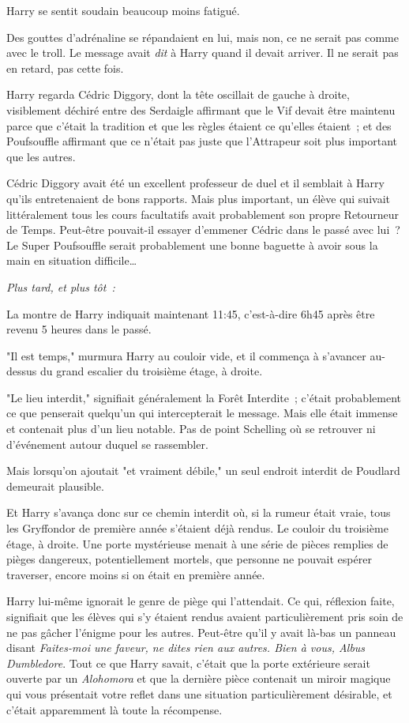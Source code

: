 Harry se sentit soudain beaucoup moins fatigué.

Des gouttes d'adrénaline se répandaient en lui, mais non, ce ne serait pas comme avec le troll. Le message avait \emph{dit} à Harry quand il devait arriver. Il ne serait pas en retard, pas cette fois.

Harry regarda Cédric Diggory, dont la tête oscillait de gauche à droite, visiblement déchiré entre des Serdaigle affirmant que le Vif devait être maintenu parce que c'était la tradition et que les règles étaient ce qu'elles étaient~; et des Poufsouffle affirmant que ce n'était pas juste que l'Attrapeur soit plus important que les autres.

Cédric Diggory avait été un excellent professeur de duel et il semblait à Harry qu'ils entretenaient de bons rapports. Mais plus important, un élève qui suivait littéralement tous les cours facultatifs avait probablement son propre Retourneur de Temps. Peut-être pouvait-il essayer d'emmener Cédric dans le passé avec lui~? Le Super Poufsouffle serait probablement une bonne baguette à avoir sous la main en situation difficile…

\later

\emph{Plus tard, et plus tôt~:}

La montre de Harry indiquait maintenant 11:45, c'est-à-dire 6h45 après être revenu 5 heures dans le passé.

"Il est temps," murmura Harry au couloir vide, et il commença à s'avancer au-dessus du grand escalier du troisième étage, à droite.

"Le lieu interdit," signifiait généralement la Forêt Interdite~; c'était probablement ce que penserait quelqu'un qui intercepterait le message. Mais elle était immense et contenait plus d'un lieu notable. Pas de point Schelling où se retrouver ni d'événement autour duquel se rassembler.

Mais lorsqu'on ajoutait "et vraiment débile," un seul endroit interdit de Poudlard demeurait plausible.

Et Harry s'avança donc sur ce chemin interdit où, si la rumeur était vraie, tous les Gryffondor de première année s'étaient déjà rendus. Le couloir du troisième étage, à droite. Une porte mystérieuse menait à une série de pièces remplies de pièges dangereux, potentiellement mortels, que personne ne pouvait espérer traverser, encore moins si on était en première année.

Harry lui-même ignorait le genre de piège qui l'attendait. Ce qui, réflexion faite, signifiait que les élèves qui s'y étaient rendus avaient particulièrement pris soin de ne pas gâcher l'énigme pour les autres. Peut-être qu'il y avait là-bas un panneau disant \emph{Faites-moi une faveur, ne dites rien aux autres. Bien à vous, Albus Dumbledore}. Tout ce que Harry savait, c'était que la porte extérieure serait ouverte par un \emph{Alohomora} et que la dernière pièce contenait un miroir magique qui vous présentait votre reflet dans une situation particulièrement désirable, et c'était apparemment là toute la récompense.

